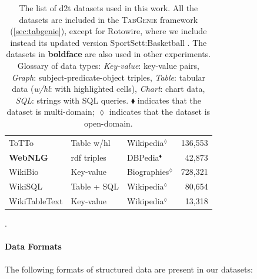 {\begin{table}[t]
\begin{tabular}{@{}lllr@{}}
        ToTTo \cite{parikhToTToControlledTableToText2020}                                          & Table w/hl           & Wikipedia$^\lozenge$    & 136,553         \\
        \textbf{WebNLG} \cite{gardentWebNLGChallengeGenerating2017}                                & \acs{rdf} triples    & DBPedia$^\blacklozenge$ & 42,873          \\
        WikiBio \cite{lebretNeuralTextGeneration2016}                                              & Key-value            & Biographies$^\lozenge$  & 728,321         \\
        WikiSQL \cite{zhong2017seq2sql}                                                            & Table + SQL          & Wikipedia$^\lozenge$    & 80,654          \\
        WikiTableText \cite{bao2018table}                                                          & Key-value            & Wikipedia$^\lozenge$    & 13,318          \\
        \bottomrule
    \end{tabular}
    \caption{The list of \ac{d2t} datasets used in this work. All the datasets are included in the \textsc{TabGenie} framework (\autoref{sec:tabgenie}), except for Rotowire, where we include instead its updated version SportSett:Basketball \cite{thomson2020sportsett}. The datasets in \textbf{boldface} are also used in other experiments. Glossary of data types: \textit{Key-value}: key-value pairs, \textit{Graph}: subject-predicate-object triples, \textit{Table}: tabular data (\textit{w/hl}: with highlighted cells), \textit{Chart}: chart data, \textit{SQL}: strings with SQL queries. $\blacklozenge$ indicates that the dataset is multi-domain; $\lozenge$ indicates that the dataset is open-domain.}
    \label{tab:datasets}.
\end{table}

\paragraph{Data Formats} The following formats of structured data are present in our datasets:

}
